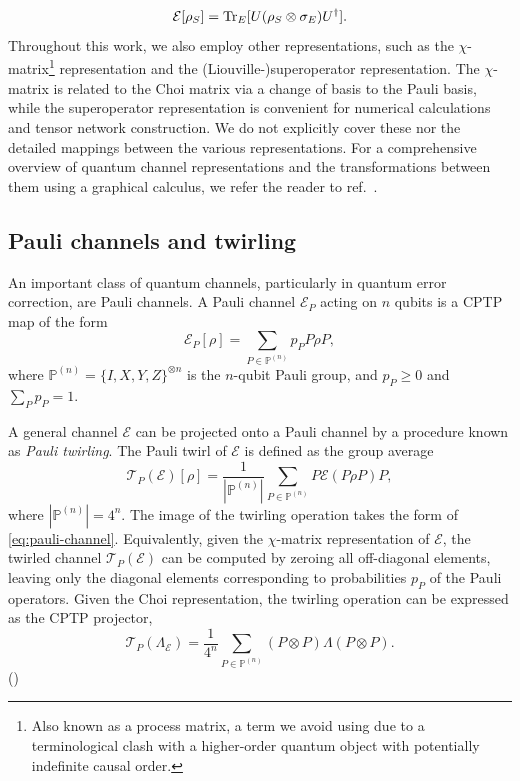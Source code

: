 \begin{equation}
    \mathcal{E}[\rho_S] = \mathrm{Tr}_E[U(\rho_S \otimes \sigma_E)U^\dagger].
\end{equation}
Throughout this work, we also employ other representations, such as the \(\chi\)-matrix\footnote{Also known as a process matrix, a term we avoid using due to a terminological clash with a higher-order quantum object with potentially indefinite causal order.} representation and the (Liouville-)superoperator representation. The \(\chi\)-matrix is related to the Choi matrix via a change of basis to the Pauli basis, while the superoperator representation is convenient for numerical calculations and tensor network construction. We do not explicitly cover these nor the detailed mappings between the various representations. For a comprehensive overview of quantum channel representations and the transformations between them using a graphical calculus, we refer the reader to ref.~\cite{woodtensor2015}.

\subsection{Pauli channels and twirling}
An important class of quantum channels, particularly in quantum error correction, are Pauli channels. A Pauli channel \(\mathcal{E}_P\) acting on \(n\) qubits is a CPTP map of the form
\begin{equation}\label{eq:pauli-channel}
    \mathcal{E}_P[\rho] = \sum_{P \in \mathbb{P}^{(n)}} p_P P \rho P,
\end{equation}
where \(\mathbb{P}^{(n)} = \{I, X, Y, Z\}^{\otimes n}\) is the \(n\)-qubit Pauli group, and \(p_P \geq 0\) and \(\sum_{P} p_P = 1\).

A general channel \(\mathcal{E}\) can be projected onto a Pauli channel by a procedure known as \emph{Pauli twirling}. The Pauli twirl of \(\mathcal{E}\) is defined as the group average
\begin{equation}\label{eq:pauli-twirl}
    \mathcal{T}_P(\mathcal{E})[\rho] = \frac{1}{|\mathbb{P}^{(n)}|} \sum_{P \in \mathbb{P}^{(n)}} P \mathcal{E}(P \rho P) P,
\end{equation}
where \(|\mathbb{P}^{(n)}| = 4^n\). The image of the twirling operation takes the form of \cref{eq:pauli-channel}. Equivalently, given the $\chi$-matrix representation of \(\mathcal{E}\), the twirled channel \(\mathcal{T}_P(\mathcal{E})\) can be computed by zeroing all off-diagonal elements, leaving only the diagonal elements corresponding to probabilities \(p_P\) of the Pauli operators. Given the Choi representation, the twirling operation can be expressed as the CPTP projector,
\begin{equation}
    \mathcal{T}_P(\Lambda_\mathcal{E}) = \frac{1}{4^n} \sum_{P \in \mathbb{P}^{(n)}} (P \otimes P) \Lambda (P \otimes P).
\end{equation}
()

